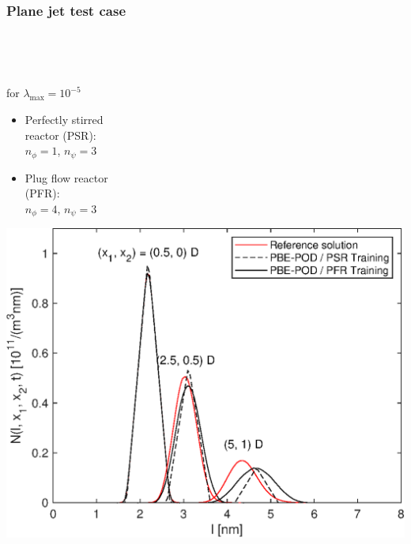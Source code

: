 \documentclass[10pt,xcolor=dvipsnames]{beamer}
\newcommand*{\itemskip}{0.25\baselineskip}
\begin{document}
\begin{frame}[t]
  
  \frametitle{Plane jet test case}
  
  \vspace{-0.5\baselineskip}
  \begin{minipage}[t]{0.7\columnwidth}\vskip0pt
  \resizebox{\columnwidth}{!}{}\\
  \end{minipage}\hfill
  \begin{minipage}[t]{0.29\columnwidth}\vskip0pt
  \hfill{}\\
  \end{minipage}  
  
  \begin{minipage}[t]{0.36\columnwidth}\vskip0pt
  \justifying{} for $\lambda_{\max} = 10^{-5}$\\
  \begin{itemize}
  \vspace{\itemskip}
  \item Perfectly stirred\\reactor (PSR):\\$n_\phi = 1$, $n_\psi = 3$
  \vspace{\itemskip}
  \item Plug flow reactor\\(PFR):\\$n_\phi = 4$, $n_\psi = 3$
  \end{itemize}
  \end{minipage}\hfill
  \begin{minipage}[t]{0.57\columnwidth}\vskip0pt  
  \hfill\includegraphics[width=\columnwidth,clip]{fig/planejet_psds_xr.eps}
  \end{minipage}

\end{frame}
\end{document}
